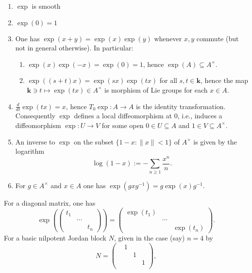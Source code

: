 \documentclass[reqno]{amsart} 
\begin{document}
\begin{enumerate}
\item $\exp$ is smooth
\item $\exp(0) = 1$
\item
  One has $\exp(x+y) = \exp(x) \exp(y)$ whenever $x,y$ commute
  (but not in general otherwise).
  In particular:
  \begin{enumerate}
  \item $\exp(x) \exp(-x) = \exp(0) = 1$,
    hence $\exp(A) \subseteq A^\times$.
  \item $\exp((s+t) x) = \exp(s x) \exp(t x)$ for all $s,t \in
    \mathbf{k}$,
    hence the map $\mathbf{k} \ni t \mapsto \exp(t x) \in
    A^\times$
    is morphism of Lie groups for each $x \in A$.
  \end{enumerate}
\item $\frac{d}{d t} \exp(t x) = x$,
  hence $T_0 \exp : A \rightarrow A$
  is the identity transformation.
  Consequently $\exp$ defines a local diffeomorphism
  at $0$,
  i.e., induces a diffeomorphism
  $\exp : U \rightarrow V$
  for some open $0 \in U \subseteq A$
  and $1 \in V \subseteq A^\times$.
\item
  An inverse to $\exp$ on the subset
  $\{1 - x : \|x\| < 1\}$ of $A^\times$
  is given by the logarithm
  \begin{equation*}
    \log(1-x) := - \sum_{n \geq 1} \frac{x^n}{n}.
  \end{equation*}
\item For $g \in A^\times$
  and $x \in A$
  one has $\exp(g x g^{-1}) = g \exp(x) g^{-1}$.
\end{enumerate}
For a diagonal matrix, one has
\begin{equation*}
  \exp (
\begin{pmatrix}
    t_1 &  &  \\
    & \dotsb  &  \\
    &  & t_n
  \end{pmatrix}
)
  = 
\begin{pmatrix}
    \exp(t_1) &  &  \\
    & \dotsb  &  \\
    &  & \exp(t_n)
  \end{pmatrix}
.
\end{equation*}
For a basic nilpotent Jordan block $N$,
given in the case (say) $n = 4$ by
\begin{equation*}
  N = 
\begin{pmatrix}
    & 1 &  & \\
    &  & 1 & \\
    &  & & 1 \\
    & & & 
  \end{pmatrix}
,
\end{equation*}
\end{document}
